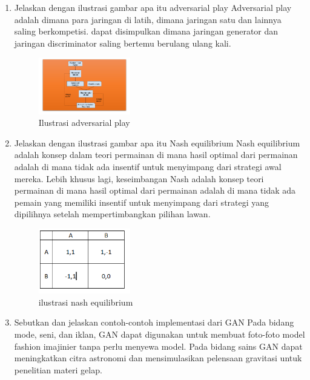 \begin{enumerate}
	\item Jelaskan dengan ilustrasi gambar apa itu adversarial play
	\hfill\break
	Adversarial play adalah dimana para jaringan di latih, dimana jaringan satu dan lainnya saling berkompetisi. dapat disimpulkan dimana jaringan generator dan jaringan discriminator saling bertemu berulang ulang kali.
	\begin{figure}[H]
	    \centering
	    \includegraphics[width=4cm]{figures/1174077/8/t6.PNG}
	    \caption{Ilustrasi adversarial play}
    \end{figure}

    \item  Jelaskan dengan ilustrasi gambar apa itu Nash equilibrium
    \hfill\break
    Nash equilibrium adalah konsep dalam teori permainan di mana hasil optimal dari permainan adalah di mana tidak ada insentif untuk menyimpang dari strategi awal mereka. Lebih khusus lagi, keseimbangan Nash adalah konsep teori permainan di mana hasil optimal dari permainan adalah di mana tidak ada pemain yang memiliki insentif untuk menyimpang dari strategi yang dipilihnya setelah mempertimbangkan pilihan lawan.
    \begin{figure}[H]
	    \centering
	    \includegraphics[width=4cm]{figures/1174077/8/t7.PNG}
	    \caption{ilustrasi nash equilibrium}
    \end{figure}

    \item Sebutkan dan jelaskan contoh-contoh implementasi dari GAN
    \hfill\break
    Pada bidang mode, seni, dan iklan, GAN dapat digunakan untuk membuat foto-foto model fashion imajinier tanpa perlu menyewa model. Pada bidang sains GAN dapat meningkatkan citra astronomi dan mensimulasikan pelensaan gravitasi untuk penelitian materi gelap.


\end{enumerate}
